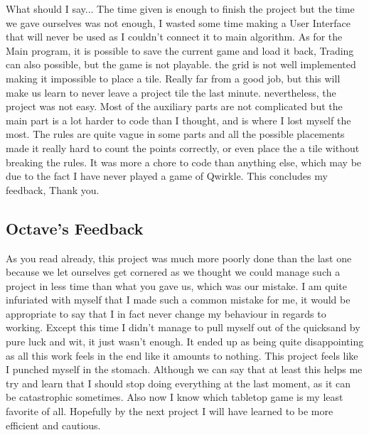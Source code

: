 \documentclass{article}
\begin{document}
What should I say... The time given is enough to finish the project but the time we gave ourselves was not enough, I wasted some time making a User Interface that will never be used as I couldn't connect it to main algorithm. As for the Main program, it is possible to save the current game and load it back, Trading can also possible, but the game is not playable. the grid is not well implemented making it impossible to place a tile. Really far from a good job, but this will make us learn to never leave a project tile the last minute. nevertheless, the project was not easy. Most of the auxiliary parts are not complicated but the main part is a lot harder to code than I thought, and is where I lost myself the most. The rules are quite vague in some parts and all the possible placements made it really hard to count the points correctly, or even place the a tile without breaking the rules. It was more a chore to code than anything else, which may be due to the fact I have never played a game of Qwirkle.
This concludes my feedback, Thank you.

\subsection{Octave's Feedback}

As you read already, this project was much more poorly done than the last one because we let ourselves get cornered as we thought we could manage such a project in less time than what you gave us, which was our mistake. I am quite infuriated with myself that I made such a common mistake for me, it would be appropriate to say that I in fact never change my behaviour in regards to working. Except this time I didn't manage to pull myself out of the quicksand by pure luck and wit, it just wasn't enough. It ended up as being quite disappointing as all this work feels in the end like it amounts to nothing. This project feels like I punched myself in the stomach. Although we can say that at least this helps me try and learn that I should stop doing everything at the last moment, as it can be catastrophic sometimes. Also now I know which tabletop game is my least favorite of all. Hopefully by the next project I will have learned to be more efficient and cautious.
\end{document}
